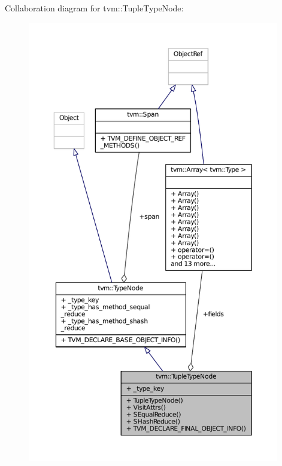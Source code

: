 Collaboration diagram for tvm\+:\+:Tuple\+Type\+Node\+:
\nopagebreak
\begin{figure}[H]
\begin{center}
\leavevmode
\includegraphics[height=550pt]{classtvm_1_1TupleTypeNode__coll__graph}
\end{center}
\end{figure}
